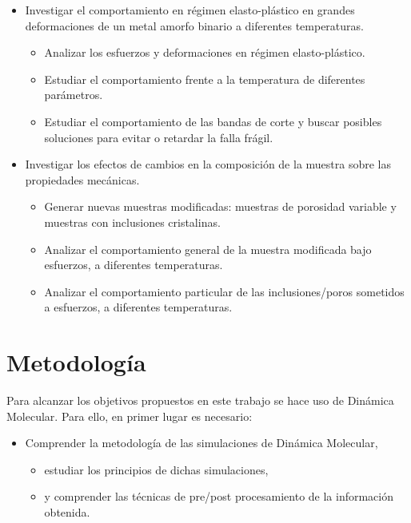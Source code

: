 \begin{itemize}
 \item Investigar el comportamiento en régimen elasto-plástico en grandes deformaciones de un metal amorfo binario a diferentes temperaturas.
 \begin{itemize}
  \item Analizar los esfuerzos y deformaciones en régimen elasto-plástico.
  \item Estudiar el comportamiento frente a la temperatura de diferentes parámetros.
  \item Estudiar el comportamiento de las bandas de corte y buscar posibles soluciones para evitar o retardar la falla frágil.
 \end{itemize}
 \item Investigar los efectos de cambios en la composición de la muestra sobre las propiedades mecánicas.
 \begin{itemize}
  \item Generar nuevas muestras modificadas: muestras de porosidad variable y muestras con inclusiones cristalinas.
  \item Analizar el comportamiento general de la muestra modificada bajo esfuerzos, a diferentes temperaturas.
  \item Analizar el comportamiento particular de las inclusiones/poros sometidos a esfuerzos, a diferentes temperaturas.
 \end{itemize}
\end{itemize}


\section{Metodología}
\label{S1_5}

Para alcanzar los objetivos propuestos en este trabajo se hace uso de Dinámica Molecular. Para ello, en primer lugar es necesario:

\begin{itemize}
 \item Comprender la metodología de las simulaciones de Dinámica Molecular,
 \begin{itemize}
  \item estudiar los principios de dichas simulaciones,
  \item y comprender las técnicas de pre/post procesamiento de la información obtenida.
 \end{itemize}
\end{itemize}

